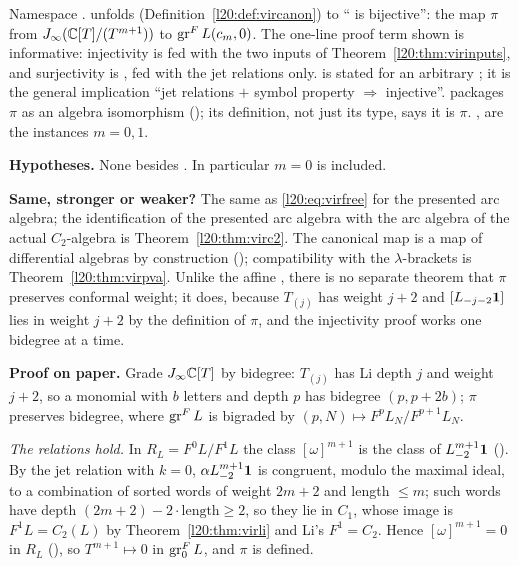 \begin{dictionary}
Namespace .  unfolds (Definition~\ref{l20:def:vircanon}) to
`` is bijective'': the map $\pi$ from
$J_\infty({\mathbb{C}}[T]/(T^{m+1}))$ to $\operatorname{gr}^F L(c_m,0)$. The one-line proof term shown is informative: injectivity is
 fed with the two inputs of Theorem~\ref{l20:thm:virinputs}, and surjectivity is
, fed with the jet relations only.  is stated for an arbitrary
; it is the general implication ``jet relations $+$ symbol property $\Rightarrow$ injective''.
 packages $\pi$ as an algebra isomorphism (); its definition, not just its
type, says it is $\pi$. ,  are the instances $m=0,1$.

\textbf{Hypotheses.} None besides . In particular $m=0$ is included.

\textbf{Same, stronger or weaker?} The same as \eqref{l20:eq:virfree} for the presented arc algebra; the identification of
the presented arc algebra with the arc algebra of the actual $C_2$-algebra is Theorem~\ref{l20:thm:virc2}. The canonical map is
a map of differential algebras by construction (); compatibility with the $\lambda$-brackets is
Theorem~\ref{l20:thm:virpva}. Unlike the affine , there is no separate theorem that
$\pi$ preserves conformal weight; it does, because $T_{(j)}$ has weight $j+2$ and $[L_{-j-2}\mathbf{1}]$ lies in weight $j+2$
by the definition of $\pi$, and the injectivity proof works one bidegree at a time.
\end{dictionary}

\textbf{Proof on paper.} Grade $J_\infty{\mathbb{C}}[T]$ by bidegree: $T_{(j)}$ has Li depth $j$ and weight $j+2$, so a monomial with
$b$ letters and depth $p$ has bidegree $(p,p+2b)$; $\pi$ preserves bidegree, where $\operatorname{gr}^F L$ is bigraded by
$(p,N)\mapsto F^pL_N/F^{p+1}L_N$.

\emph{The relations hold.} In $R_L=F^0L/F^1L$ the class $[\omega]^{m+1}$ is the class of $L_{-2}^{m+1}\mathbf{1}$
(). By the jet relation with $k=0$, $\alpha L_{-2}^{m+1}\mathbf{1}$ is congruent, modulo the maximal
ideal, to a combination of sorted words of weight $2m+2$ and length $\le m$; such words have depth $(2m+2)-2\cdot\text{length}\ge2$,
so they lie in $C_1$, whose image is $F^1L=C_2(L)$ by Theorem~\ref{l20:thm:virli} and Li's $F^1=C_2$. Hence $[\omega]^{m+1}=0$ in
$R_L$ (), so $T^{m+1}\mapsto0$ in $\operatorname{gr}^F_0L$, and $\pi$ is defined.

